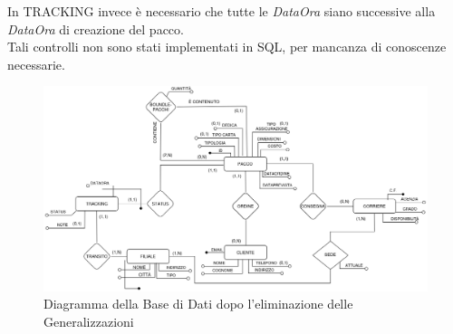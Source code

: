 In TRACKING invece è necessario che tutte le \textit{DataOra} siano successive alla \textit{DataOra} di creazione del pacco.\\
Tali controlli non sono stati implementati in SQL, per mancanza di conoscenze necessarie.\\
\begin{figure}[H]
\centering
\includegraphics[width=1 \textwidth]{Resources/ML.png}
\caption{Diagramma della Base di Dati dopo l'eliminazione delle Generalizzazioni}
\label{ML}
\end{figure}


